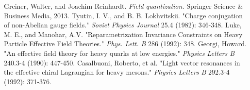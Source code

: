 \documentclass{article}
\begin{document}

\begin{thebibliography}{}
  Greiner, Walter, and Joachim Reinhardt. \textit{Field quantization.} Springer Science \& Business Media, 2013.
  Tyutin, I. V., and B. B. Lokhvitskii. "Charge conjugation of non-Abelian gauge fields." \textit{Soviet Physics Journal} 25.4 (1982): 346-348.
  Luke, M. E., and Manohar, A.V. "Reparametrization Invariance Constraints on Heavy Particle Effective Field Theories." \textit{Phys. Lett. B} 286 (1992): 348.
  Georgi, Howard. "An effective field theory for heavy quarks at low energies." \textit{Physics Letters B} 240.3-4 (1990): 447-450.
  Casalbuoni, Roberto, et al. "Light vector resonances in the effective chiral Lagrangian for heavy mesons." \textit{Physics Letters B} 292.3-4 (1992): 371-376.
\end{thebibliography}
\end{document}
